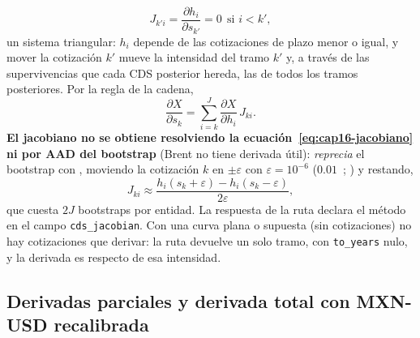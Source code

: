 \begin{sloppypar}
\begin{equation}
  J_{k'i}=\frac{\partial h_i}{\partial s_{k'}}=0\ \ \text{si }i<k',
\end{equation}
un sistema triangular: $h_i$ depende de las cotizaciones de plazo menor o igual, y mover la cotización $k'$
mueve la intensidad del tramo $k'$ y, a través de las supervivencias que cada CDS posterior hereda, las de todos los
tramos posteriores. Por la regla de la cadena,
\begin{equation}\label{eq:cap16-cadena}
  \frac{\partial X}{\partial s_k}=\sum_{i=k}^{J}\frac{\partial X}{\partial h_i}\,J_{ki}.
\end{equation}
\textbf{El jacobiano no se obtiene resolviendo la ecuación~\eqref{eq:cap16-jacobiano} ni por AAD del bootstrap}
(Brent no tiene derivada útil):  \emph{reprecia} el bootstrap con
, moviendo la cotización $k$ en $\pm\varepsilon$ con $\varepsilon=10^{-6}$ ($0.01$~\pb;
) y restando,
\begin{equation}\label{eq:cap16-jacobiano-reprecio}
  J_{ki}\approx\frac{h_i(s_k+\varepsilon)-h_i(s_k-\varepsilon)}{2\varepsilon},
\end{equation}
que cuesta $2J$ bootstraps por entidad. La respuesta de la ruta declara el método en el campo \texttt{cds\_jacobian}.
Con una curva plana o supuesta (sin cotizaciones) no hay cotizaciones que derivar: la ruta devuelve un solo tramo, con
\texttt{to\_years} nulo, y la derivada es respecto de esa intensidad.

\subsection{Derivadas parciales y derivada total con MXN-USD recalibrada}\label{sec:cap16-parcial}


\end{sloppypar}
